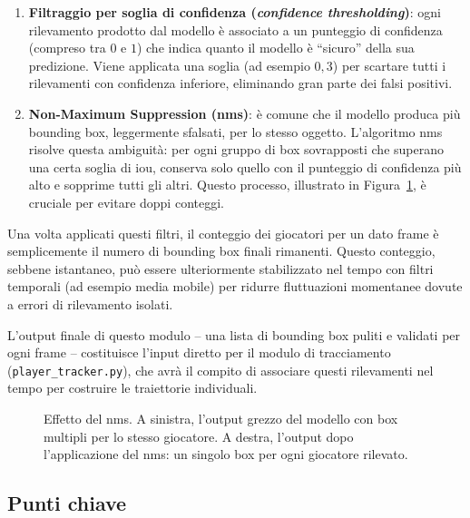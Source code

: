 \documentclass[12pt,a4paper,openright,twoside]{book}
\begin{document}
\begin{enumerate}
  \item \textbf{Filtraggio per soglia di confidenza (\emph{confidence thresholding})}: ogni rilevamento prodotto dal modello è associato a un 
  punteggio di confidenza (compreso tra $0$ e $1$) che indica quanto il modello è ``sicuro'' della sua predizione. Viene applicata una soglia 
  (ad esempio $0{,}3$) per scartare tutti i rilevamenti con confidenza inferiore, eliminando gran parte dei falsi positivi.
  \item \textbf{Non-Maximum Suppression (\ac{nms})}: è comune che il modello produca più bounding box, leggermente sfalsati, per lo stesso oggetto. 
  L'algoritmo \ac{nms} risolve questa ambiguità: per ogni gruppo di box sovrapposti che superano una certa soglia di \ac{iou}, conserva solo quello 
  con il punteggio di confidenza più alto e sopprime tutti gli altri. Questo processo, illustrato in Figura~\ref{fig:nms_effect}, è cruciale per 
  evitare doppi conteggi.
\end{enumerate}

Una volta applicati questi filtri, il conteggio dei giocatori per un dato frame è semplicemente il numero di bounding box finali rimanenti. 
Questo conteggio, sebbene istantaneo, può essere ulteriormente stabilizzato nel tempo con filtri temporali (ad esempio media mobile) per ridurre 
fluttuazioni momentanee dovute a errori di rilevamento isolati.

L'output finale di questo modulo -- una lista di bounding box puliti e validati per ogni frame -- costituisce l'input diretto per il modulo di 
tracciamento (\texttt{player\_tracker.py}), che avrà il compito di associare questi rilevamenti nel tempo per costruire le traiettorie individuali.

\begin{figure}[h]
  \centering
  \caption{Effetto del \ac{nms}. A sinistra, l'output grezzo del modello con box multipli per lo stesso giocatore. A destra, l'output dopo 
  l'applicazione del \ac{nms}: un singolo box per ogni giocatore rilevato.}
  \label{fig:nms_effect}
\end{figure}

\subsection*{Punti chiave}
\end{document}
